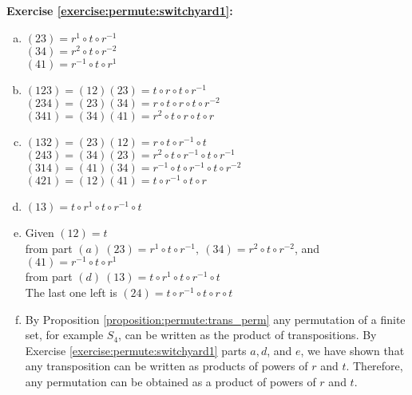 \noindent\textbf{Exercise \ref{exercise:permute:switchyard1}:} %
\begin{enumerate}[(a)]
\item
$(23)=r^{1}\circ t\circ r^{-1}$ \\
$(34)=r^{2}\circ t\circ r^{-2}$ \\
$(41)=r^{-1}\circ t\circ r^{1}$ 

\item
$(123)=(12)(23)=t\circ r\circ t\circ r^{-1}$ \\
$(234)=(23)(34)=r\circ t\circ r\circ t\circ r^{-2}$ \\
$(341)=(34)(41)=r^{2}\circ t\circ r\circ t\circ r$ 

\item
$(132)=(23)(12)=r\circ t\circ r^{-1}\circ t$ \\
$(243)=(34)(23)=r^{2}\circ t\circ r^{-1}\circ t\circ r^{-1}$ \\
$(314)=(41)(34)=r^{-1}\circ t\circ r^{-1}\circ t\circ r^{-2}$ \\
$(421)=(12)(41)=t\circ r^{-1}\circ t\circ r$ 

\item
$(13)=t\circ r^{1}\circ t\circ r^{-1}\circ t$

\item
Given $(12)=t$\\
from part $(a)\ (23) = r^{1}\circ t\circ r^{-1},\ (34) = r^{2}\circ t\circ r^{-2}$, and $(41) = r^{-1}\circ t\circ r^{1}$\\
from part $(d)\ (13) = t\circ r^{1}\circ t\circ r^{-1}\circ t$\\
The last one left is $(24) = t\circ r^{-1}\circ t\circ r\circ t$

\item
By Proposition \ref{proposition:permute:trans_perm} any permutation of a finite set, for example $S_4$, can be written as the product of transpositions.  By Exercise \ref{exercise:permute:switchyard1} parts $a, d$, and $e$, we have shown that any transposition can be written as products of powers of $r$ and $t$.  Therefore, any permutation can be obtained as a product of powers of $r$ and $t$.
\end{enumerate}

